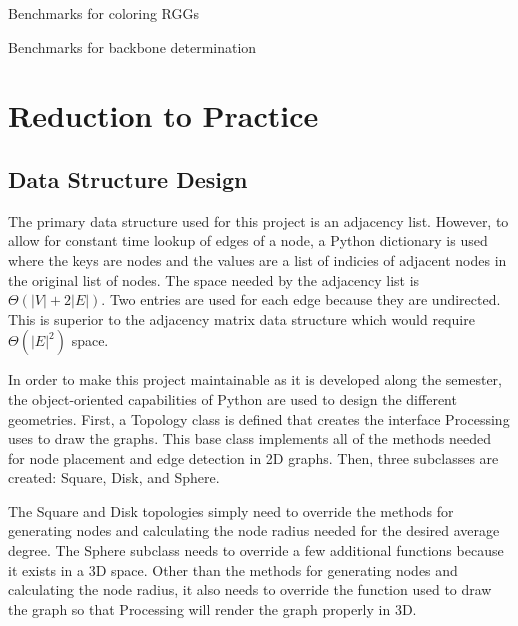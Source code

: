 \documentclass{article}
\begin{document}
    \begin{center}
        \begin{table}[h]
            \centering
            \caption{Benchmarks for coloring RGGs}
            \label{tab2}
        \end{table}
    \end{center}

    \begin{center}
        \begin{table}[h]
            \centering
            \caption{Benchmarks for backbone determination}
            \label{tab3}
        \end{table}
    \end{center}

\section{Reduction to Practice}

    \subsection{Data Structure Design}
    The primary data structure used for this project is an adjacency list. However, to allow for constant time lookup of edges of a node, a Python dictionary is used where the keys are nodes and the values are a list of indicies of adjacent nodes in the original list of nodes. The space needed by the adjacency list is $\Theta(|V| + 2|E|)$. Two entries are used for each edge because they are undirected. This is superior to the adjacency matrix data structure which would require $\Theta(|E|^2)$ space.
    \par
    In order to make this project maintainable as it is developed along the semester, the object-oriented capabilities of Python are used to design the different geometries. First, a Topology class is defined that creates the interface Processing uses to draw the graphs. This base class implements all of the methods needed for node placement and edge detection in 2D graphs. Then, three subclasses are created: Square, Disk, and Sphere.
    \par
    The Square and Disk topologies simply need to override the methods for generating nodes and calculating the node radius needed for the desired average degree. The Sphere subclass needs to override a few additional functions because it exists in a 3D space. Other than the methods for generating nodes and calculating the node radius, it also needs to override the function used to draw the graph so that Processing will render the graph properly in 3D.
\end{document}

